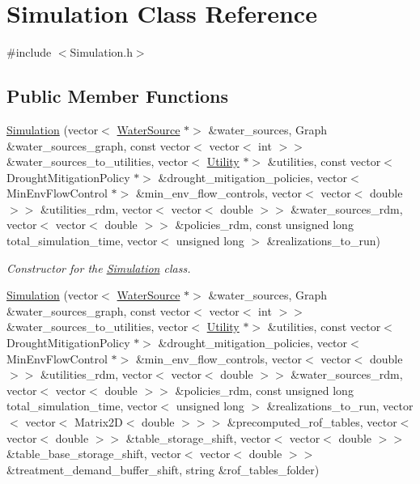 \hypertarget{classSimulation}{}\section{Simulation Class Reference}
\label{classSimulation}


{\ttfamily \#include $<$Simulation.\+h$>$}

\subsection*{Public Member Functions}
\begin{DoxyCompactItemize}
\item 
\mbox{\hyperlink{classSimulation_ac9b9db9c3de5f9ff33f6ea89e2435c87}{Simulation}} (vector$<$ \mbox{\hyperlink{classWaterSource}{Water\+Source}} $\ast$$>$ \&water\+\_\+sources, Graph \&water\+\_\+sources\+\_\+graph, const vector$<$ vector$<$ int $>$$>$ \&water\+\_\+sources\+\_\+to\+\_\+utilities, vector$<$ \mbox{\hyperlink{classUtility}{Utility}} $\ast$$>$ \&utilities, const vector$<$ Drought\+Mitigation\+Policy $\ast$$>$ \&drought\+\_\+mitigation\+\_\+policies, vector$<$ Min\+Env\+Flow\+Control $\ast$$>$ \&min\+\_\+env\+\_\+flow\+\_\+controls, vector$<$ vector$<$ double $>$$>$ \&utilities\+\_\+rdm, vector$<$ vector$<$ double $>$$>$ \&water\+\_\+sources\+\_\+rdm, vector$<$ vector$<$ double $>$$>$ \&policies\+\_\+rdm, const unsigned long total\+\_\+simulation\+\_\+time, vector$<$ unsigned long $>$ \&realizations\+\_\+to\+\_\+run)
\begin{DoxyCompactList}\small\item\em Constructor for the \mbox{\hyperlink{classSimulation}{Simulation}} class. \end{DoxyCompactList}\item 
\mbox{\hyperlink{classSimulation_a99c76e396f63ca8f98d362c76804345b}{Simulation}} (vector$<$ \mbox{\hyperlink{classWaterSource}{Water\+Source}} $\ast$$>$ \&water\+\_\+sources, Graph \&water\+\_\+sources\+\_\+graph, const vector$<$ vector$<$ int $>$$>$ \&water\+\_\+sources\+\_\+to\+\_\+utilities, vector$<$ \mbox{\hyperlink{classUtility}{Utility}} $\ast$$>$ \&utilities, const vector$<$ Drought\+Mitigation\+Policy $\ast$$>$ \&drought\+\_\+mitigation\+\_\+policies, vector$<$ Min\+Env\+Flow\+Control $\ast$$>$ \&min\+\_\+env\+\_\+flow\+\_\+controls, vector$<$ vector$<$ double $>$$>$ \&utilities\+\_\+rdm, vector$<$ vector$<$ double $>$$>$ \&water\+\_\+sources\+\_\+rdm, vector$<$ vector$<$ double $>$$>$ \&policies\+\_\+rdm, const unsigned long total\+\_\+simulation\+\_\+time, vector$<$ unsigned long $>$ \&realizations\+\_\+to\+\_\+run, vector$<$ vector$<$ Matrix2D$<$ double $>$$>$$>$ \&precomputed\+\_\+rof\+\_\+tables, vector$<$ vector$<$ double $>$$>$ \&table\+\_\+storage\+\_\+shift, vector$<$ vector$<$ double $>$$>$ \&table\+\_\+base\+\_\+storage\+\_\+shift, vector$<$ vector$<$ double $>$$>$ \&treatment\+\_\+demand\+\_\+buffer\+\_\+shift, string \&rof\+\_\+tables\+\_\+folder)
$$
\end{DoxyCompactItemize}
